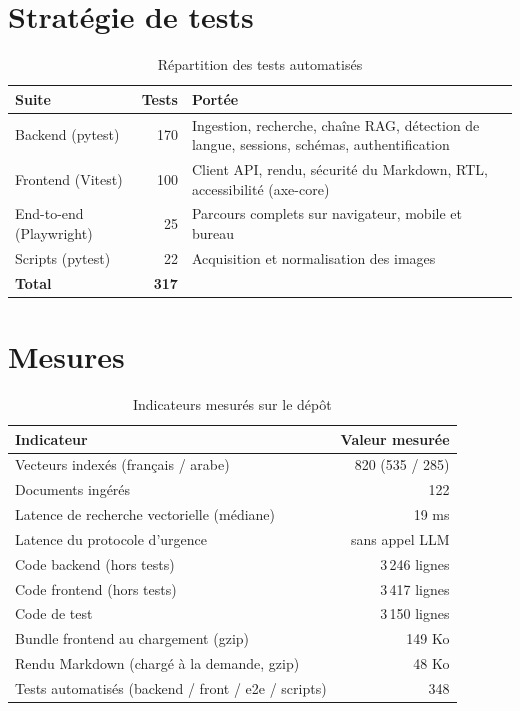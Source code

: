 \documentclass[a4paper,11pt,twoside]{report}
\begin{document}
\section{Stratégie de tests}

\begin{table}[htbp]
\centering
\small
\begin{tabular}{@{}lrp{6.4cm}@{}}
\toprule
\textbf{Suite} & \textbf{Tests} & \textbf{Portée} \\
\midrule
Backend (pytest)            & 170 & Ingestion, recherche, chaîne RAG, détection de langue, sessions, schémas, authentification \\
Frontend (Vitest)           & 100 & Client API, rendu, sécurité du Markdown, RTL, accessibilité (axe-core) \\
End-to-end (Playwright)     & 25  & Parcours complets sur navigateur, mobile et bureau \\
Scripts (pytest)            & 22  & Acquisition et normalisation des images \\
\midrule
\textbf{Total}              & \textbf{317} & \\
\bottomrule
\end{tabular}
\caption{Répartition des tests automatisés}
\label{tab:tests}
\end{table}

\section{Mesures}

\begin{table}[htbp]
\centering
\small
\begin{tabular}{@{}lr@{}}
\toprule
\textbf{Indicateur} & \textbf{Valeur mesurée} \\
\midrule
Vecteurs indexés (français / arabe) & 820 (535 / 285) \\
Documents ingérés                   & 122 \\
Latence de recherche vectorielle (médiane) & 19 ms \\
Latence du protocole d'urgence      & sans appel LLM \\
Code backend (hors tests)           & 3\,246 lignes \\
Code frontend (hors tests)          & 3\,417 lignes \\
Code de test                        & 3\,150 lignes \\
Bundle frontend au chargement (gzip) & 149 Ko \\
Rendu Markdown (chargé à la demande, gzip) & 48 Ko \\
Tests automatisés (backend / front / e2e / scripts) & 348 \\
\bottomrule
\end{tabular}
\caption{Indicateurs mesurés sur le dépôt}
\label{tab:metrics}
\end{table}
\end{document}
